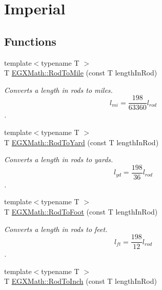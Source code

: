 \hypertarget{group___e_g_x_math-_conversions-_length_conversions-_surveyors-_rod-_imperial}{}\section{Imperial}
\label{group___e_g_x_math-_conversions-_length_conversions-_surveyors-_rod-_imperial}
\subsection*{Functions}
\begin{DoxyCompactItemize}
\item 
{\footnotesize template$<$typename T $>$ }\\T \mbox{\hyperlink{group___e_g_x_math-_conversions-_length_conversions-_surveyors-_rod-_imperial_ga0ef0f9142bc6954af0961dabcf231abe}{E\+G\+X\+Math\+::\+Rod\+To\+Mile}} (const T length\+In\+Rod)
\begin{DoxyCompactList}\small\item\em Converts a length in rods to miles. \[ l_{mi}=\frac{198}{63360} l_{rod} \]. \end{DoxyCompactList}\item 
{\footnotesize template$<$typename T $>$ }\\T \mbox{\hyperlink{group___e_g_x_math-_conversions-_length_conversions-_surveyors-_rod-_imperial_gaf9c279c2819bf2c950dcde7a67849bf6}{E\+G\+X\+Math\+::\+Rod\+To\+Yard}} (const T length\+In\+Rod)
\begin{DoxyCompactList}\small\item\em Converts a length in rods to yards. \[ l_{yd}= \frac{198}{36} l_{rod} \]. \end{DoxyCompactList}\item 
{\footnotesize template$<$typename T $>$ }\\T \mbox{\hyperlink{group___e_g_x_math-_conversions-_length_conversions-_surveyors-_rod-_imperial_ga5d9948f5cfc97d94698be96955a9df7f}{E\+G\+X\+Math\+::\+Rod\+To\+Foot}} (const T length\+In\+Rod)
\begin{DoxyCompactList}\small\item\em Converts a length in rods to feet. \[ l_{ft}= \frac{198}{12} l_{rod} \]. \end{DoxyCompactList}\item 
{\footnotesize template$<$typename T $>$ }\\T \mbox{\hyperlink{group___e_g_x_math-_conversions-_length_conversions-_surveyors-_rod-_imperial_gaa49be09f9d06ac2d8a5e0c3079a8ce5d}{E\+G\+X\+Math\+::\+Rod\+To\+Inch}} (const T length\+In\+Rod)

\end{DoxyCompactItemize}
